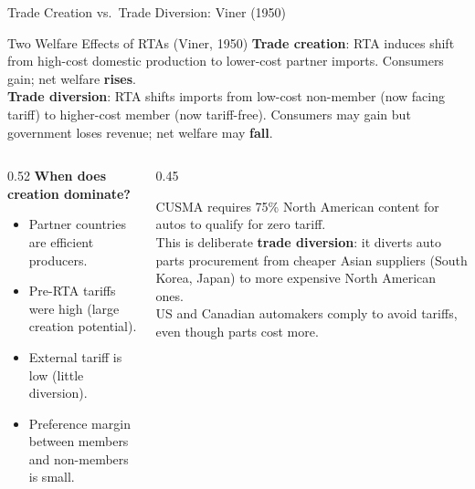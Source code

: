 \documentclass[aspectratio=169]{beamer}
\begin{document}
\begin{frame}{Trade Creation vs.\ Trade Diversion: Viner (1950)}
\begin{block}{Two Welfare Effects of RTAs (Viner, 1950)}
\textbf{Trade creation}: RTA induces shift from high-cost domestic production to lower-cost partner imports. Consumers gain; net welfare \textcolor{AccentTeal}{\textbf{rises}}.\\[0.3em]
\textbf{Trade diversion}: RTA shifts imports from low-cost non-member (now facing tariff) to higher-cost member (now tariff-free). Consumers may gain but government loses revenue; net welfare may \textcolor{AccentRed}{\textbf{fall}}.
\end{block}
\vspace{0.3em}
\begin{columns}
\begin{column}{0.52\textwidth}
\textbf{When does creation dominate?}
\begin{itemize}
  \item Partner countries are efficient producers.
  \item Pre-RTA tariffs were high (large creation potential).
  \item External tariff is low (little diversion).
  \item Preference margin between members and non-members is small.
\end{itemize}
\end{column}
\begin{column}{0.45\textwidth}
\begin{canadex}
  CUSMA requires 75\% North American content for autos to qualify for zero tariff.\\[0.3em]
  This is deliberate \textbf{trade diversion}: it diverts auto parts procurement from cheaper Asian suppliers (South Korea, Japan) to more expensive North American ones.\\[0.3em]
  US and Canadian automakers comply to avoid tariffs, even though parts cost more.
\end{canadex}
\end{column}
\end{columns}
\end{frame}
\end{document}
